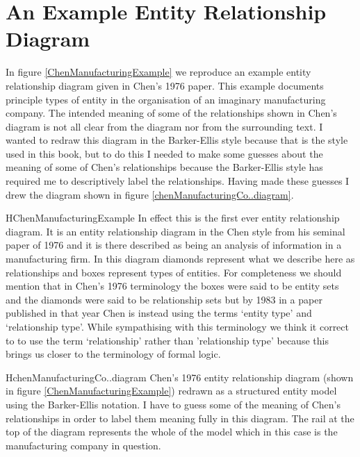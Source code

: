 \section{An Example Entity Relationship Diagram}
\label{AnExampleEntityRelationshipDiagram}
In figure \ref{ChenManufacturingExample} we reproduce an example entity relationship diagram  given in Chen's 1976 paper. This example documents principle types of entity in the organisation of an imaginary manufacturing company. The intended meaning of some of the relationships shown in Chen's diagram is not all clear from the diagram nor from the surrounding text. I wanted to redraw
this diagram in the Barker-Ellis style because that is the style used in this book, but to do this I needed to make some guesses about the meaning of some of Chen's relationships because the Barker-Ellis style has required me to descriptively label the relationships. Having made these guesses I drew the diagram shown
 in figure \ref{chenManufacturingCo..diagram}. 

\begin{erboxedFigure} {H}{ChenManufacturingExample}{
In effect this is the first ever entity relationship diagram. It is an entity relationship diagram in the Chen style from his seminal paper of 1976 and it is there described as being an analysis of information in a manufacturing firm. In this diagram
diamonds represent what we describe here as relationships and boxes represent types of entities.  
For completeness we should mention that in Chen's 1976 terminology the boxes were said to be entity sets and the diamonds were said to be relationship sets but by 1983 in a paper published in that year Chen is instead using the terms `entity type' and `relationship type'. While sympathising with this terminology we think it correct to to use the term `relationship' rather than 'relationship type' because this brings us closer to the terminology of formal logic.
}
\begin{center}
\scalebox{0.80}{}
\end{center}
\end{erboxedFigure}

\begin{erboxedFigure} {H}{chenManufacturingCo..diagram}{
Chen's 1976 entity relationship diagram (shown in figure \ref{ChenManufacturingExample}) 
redrawn as a structured entity model using the Barker-Ellis notation. 
I have to guess some of the meaning of Chen's relationships in order to label them meaning fully in
 this diagram. 
 The rail at the top of the diagram represents the whole of the model which in this case is the manufacturing company in question.
}
\begin{center}
\scalebox{0.95}{}
\end{center}
\end{erboxedFigure}

